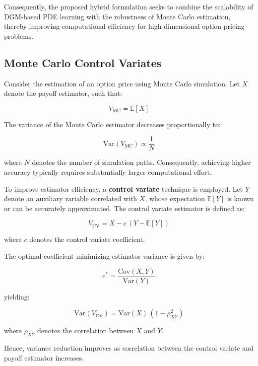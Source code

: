 \documentclass[12pt, a4paper]{article}
\begin{document}
Consequently, the proposed hybrid formulation seeks to combine the
scalability of DGM-based PDE learning with the robustness of Monte
Carlo estimation, thereby improving computational efficiency for
high-dimensional option pricing problems.

\subsection{Monte Carlo Control Variates}

Consider the estimation of an option price using Monte Carlo
simulation. Let $X$ denote the payoff estimator, such that:

\[
    V_{\mathrm{MC}} = \mathbb{E}[X]
\]

The variance of the Monte Carlo estimator decreases proportionally to:

\[
    \mathrm{Var}(V_{\mathrm{MC}}) \propto \frac{1}{N}
\]

where $N$ denotes the number of simulation paths. Consequently,
achieving higher accuracy typically requires substantially larger
computational effort.

To improve estimator efficiency, a \textbf{control variate} technique
is employed. Let $Y$ denote an auxiliary variable correlated with $X$,
whose expectation $\mathbb{E}[Y]$ is known or can be accurately
approximated. The control variate estimator is defined as:

\begin{equation}
    V_{\mathrm{CV}} = X - c\,(Y - \mathbb{E}[Y])
    \label{eq:cv}
\end{equation}

where $c$ denotes the control variate coefficient.

The optimal coefficient minimizing estimator variance is given by:

\begin{equation}
    c^* = \frac{\mathrm{Cov}(X,Y)}{\mathrm{Var}(Y)}
    \label{eq:opt_coeff_4}
\end{equation}

yielding:

\begin{equation}
    \mathrm{Var}(V_{\mathrm{CV}}) = \mathrm{Var}(X)\,(1 - \rho_{XY}^2)
    \label{eq:var_cv}
\end{equation}

where $\rho_{XY}$ denotes the correlation between $X$ and $Y$.

Hence, variance reduction improves as correlation between the control
variate and payoff estimator increases.
\end{document}
